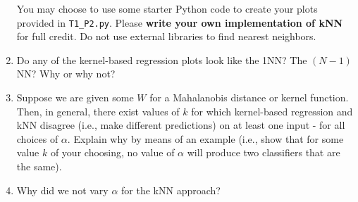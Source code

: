 \documentclass[submit]{harvardml}
\begin{document}
\begin{problem}
\begin{enumerate}
  You may choose to use some starter Python code to create your plots
  provided in \verb|T1_P2.py|.  Please \textbf{write your own
    implementation of kNN} for full credit.  Do not use external
  libraries to find nearest neighbors.
  
\item Do any of the kernel-based regression plots look like the 1NN?
  The $(N-1)$NN?  Why or why not?

\item Suppose we are given some $W$ for a Mahalanobis distance or
  kernel function.  Then, in general, there exist values of $k$ for which
  kernel-based regression and kNN disagree (i.e., make different predictions)
  on at least one input - for all choices of $\alpha$. Explain why by means of
  an example (i.e., show that for some value $k$ of your choosing,
  no value of $\alpha$ will produce two classifiers that are the same).
    
\item Why did we not vary $\alpha$ for the kNN approach?    

\end{enumerate}

\end{problem}


\newpage 

\end{document}
